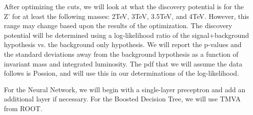 \documentclass[]{article}
\begin{document}
After optimizing the cuts, we will look at what the discovery potential is for the Z' for at least the following masses: 2TeV, 3TeV, 3.5TeV, and 4TeV. However, this range
may change based upon the results of the optimization. The discovery potential will be determined using a log-likelihood ratio of the signal+background hypothesis vs. the
background only hypothesis. We will report the p-values and the standard deviations away from the background hypothesis as a function of invariant mass and integrated
luminosity. The pdf that we will assume the data follows is Possion, and will use this in our determinations of the log-likelihood.

For the Neural Network, we will begin with a single-layer preceptron and add an additional layer if necessary. For the Boosted Decision Tree, we will use TMVA from ROOT. 
\end{document}
